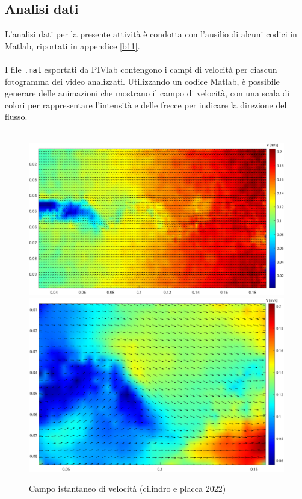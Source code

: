 \subsection{Analisi dati}
L'analisi dati per la presente attività è condotta con l'ausilio di alcuni codici in Matlab, riportati in appendice \ref{b11}.\\\\
I file \texttt{.mat} esportati da PIVlab contengono i campi di velocità per ciascun fotogramma dei video analizzati. Utilizzando un codice Matlab, è possibile generare delle animazioni che mostrano il campo di velocità, con una scala di colori per rappresentare l'intensità e delle frecce per indicare la direzione del flusso.\\\\
\begin{figure}[H]
    \centering
    \includegraphics[height=.52\textwidth]{images/11/f300_22b.png}
    \includegraphics[height=.5\textwidth]{images/11/f300_220.png}
    \caption{Campo istantaneo di velocità (cilindro e placca 2022)}
\end{figure}

